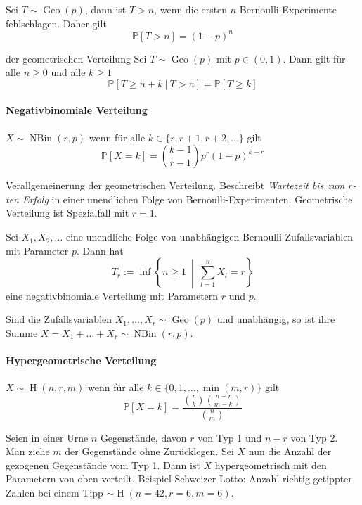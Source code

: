 \documentclass[a4paper,10pt]{article}
\def\P{\mathbb{P}}
\DeclareMathOperator{\Geometrisch}{\mathrm{Geo}}
\DeclareMathOperator{\NegativBinomial}{\mathrm{NBin}}
\DeclareMathOperator{\Hypergeometrisch}{\mathrm{H}}
\begin{document}
Sei \( T \sim \Geometrisch(p) \), dann ist \( T > n \), wenn die ersten \( n \) Bernoulli-Experimente fehlschlagen. Daher gilt
\[ \P[T > n] = (1 - p)^n \]

\begin{subbox}{ der geometrischen Verteilung}
    Sei \( T \sim \Geometrisch(p) \) mit \( p \in (0, 1) \). Dann gilt für alle \( n \geq 0 \) und alle \( k \geq 1 \)
    \[ \P[T \geq n + k \: | \: T > n] = \P[T \geq k] \]
\end{subbox}

\paragraph{Negativbinomiale Verteilung} \( X \sim \NegativBinomial(r, p) \) wenn für alle \( k \in \{r, r + 1, r + 2, \dots\} \) gilt
\[ \P[X = k] = \binom{k - 1}{r - 1} p^r (1 - p)^{k - r} \]

Verallgemeinerung der geometrischen Verteilung. Beschreibt \emph{Wartezeit bis zum \( r \)-ten Erfolg} in einer unendlichen Folge von Bernoulli-Experimenten. Geometrische Verteilung ist Spezialfall mit \( r = 1 \).

\begin{subbox}{}
    Sei \( X_1, X_2, \dots \) eine unendliche Folge von unabhängigen Bernoulli-Zufallsvariablen mit Parameter \( p \). Dann hat
    \[ T_r := \inf \left\{ n \geq 1 \: \middle| \: \sum_{l = 1}^n X_l = r \right\} \]
    eine negativbinomiale Verteilung mit Parametern \( r \) und \( p \).
\end{subbox}

Sind die Zufallsvariablen \( X_1, \dots, X_r \sim \Geometrisch(p) \) und unabhängig, so ist ihre Summe \( X = X_1 + \dots + X_r \sim \NegativBinomial(r, p) \).

\paragraph{Hypergeometrische Verteilung} \( X \sim \Hypergeometrisch(n, r, m) \) wenn für alle \( k \in \{0, 1, \dots, \min(m, r)\} \) gilt
\[ \P[X = k] = \frac{\binom{r}{k} \binom{n - r}{m - k}}{\binom{n}{m}} \]

Seien in einer Urne \( n \) Gegenstände, davon \( r \) von Typ 1 und \( n - r \)  von Typ 2. Man ziehe \( m \) der Gegenstände ohne Zurücklegen. Sei \( X \) nun die Anzahl der gezogenen Gegenstände vom Typ 1. Dann ist \( X \) hypergeometrisch mit den Parametern von oben verteilt. Beispiel Schweizer Lotto: Anzahl richtig getippter Zahlen bei einem Tipp \( \sim \Hypergeometrisch(n=42, r=6, m=6) \).
\end{document}
